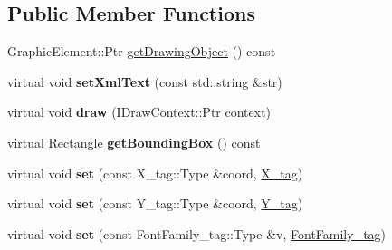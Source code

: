 \subsection*{Public Member Functions}
\begin{DoxyCompactItemize}
\item 
GraphicElement::Ptr \hyperlink{classsambag_1_1disco_1_1svg_1_1_svg_text_af07f166b433d947c117c797bd8891e89}{getDrawingObject} () const 
\item 
\hypertarget{classsambag_1_1disco_1_1svg_1_1_svg_text_a51de673f772b87db82987130a113acbf}{
virtual void {\bfseries setXmlText} (const std::string \&str)}
\label{classsambag_1_1disco_1_1svg_1_1_svg_text_a51de673f772b87db82987130a113acbf}

\item 
\hypertarget{classsambag_1_1disco_1_1svg_1_1_svg_text_a277aeb70f8be0bbcdda7b5b030055c8b}{
virtual void {\bfseries draw} (IDrawContext::Ptr context)}
\label{classsambag_1_1disco_1_1svg_1_1_svg_text_a277aeb70f8be0bbcdda7b5b030055c8b}

\item 
\hypertarget{classsambag_1_1disco_1_1svg_1_1_svg_text_a141e0b3318056fd5f3015efd89e654ac}{
virtual \hyperlink{classsambag_1_1com_1_1_rectangle}{Rectangle} {\bfseries getBoundingBox} () const }
\label{classsambag_1_1disco_1_1svg_1_1_svg_text_a141e0b3318056fd5f3015efd89e654ac}

\item 
\hypertarget{classsambag_1_1disco_1_1svg_1_1_svg_text_a5b9a2141048f6ce528dde97ce93e77cb}{
virtual void {\bfseries set} (const X\_\-tag::Type \&coord, \hyperlink{structsambag_1_1disco_1_1svg_1_1_svg_text_1_1_x__tag}{X\_\-tag})}
\label{classsambag_1_1disco_1_1svg_1_1_svg_text_a5b9a2141048f6ce528dde97ce93e77cb}

\item 
\hypertarget{classsambag_1_1disco_1_1svg_1_1_svg_text_a4f3a085623991ebf973fefec6941a1f4}{
virtual void {\bfseries set} (const Y\_\-tag::Type \&coord, \hyperlink{structsambag_1_1disco_1_1svg_1_1_svg_text_1_1_y__tag}{Y\_\-tag})}
\label{classsambag_1_1disco_1_1svg_1_1_svg_text_a4f3a085623991ebf973fefec6941a1f4}

\item 
\hypertarget{classsambag_1_1disco_1_1svg_1_1_svg_text_a82c0569e702edfc486e107eb025c2489}{
virtual void {\bfseries set} (const FontFamily\_\-tag::Type \&v, \hyperlink{structsambag_1_1disco_1_1svg_1_1_svg_text_1_1_font_family__tag}{FontFamily\_\-tag})}
\label{classsambag_1_1disco_1_1svg_1_1_svg_text_a82c0569e702edfc486e107eb025c2489}


\end{DoxyCompactItemize}
